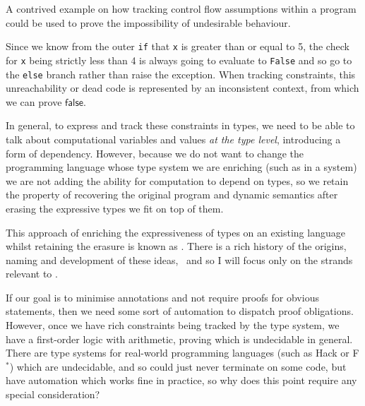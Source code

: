 \begin{marginfigure}
    \inputminted[breaklines,mathescape,fontsize=\small]{py}{code/dead_code.py}
    \caption{A contrived example on how tracking control flow assumptions
        within a program could be used to prove the impossibility of
        undesirable behaviour.}\label{fig:dead-code}
\end{marginfigure}

Since we know from the outer \texttt{if} that \texttt{x} is
greater than or equal to 5, the check for \texttt{x} being strictly
less than 4 is always going to evaluate to \texttt{False} and so go to
the \texttt{else} branch rather than raise the exception. When tracking
constraints, this unreachability or dead code is represented by an inconsistent
context, from which we can prove $\mathsf{false}$.

In general, to express and track these constraints in types, we need to be able
to talk about computational variables and values \emph{at the type level},
introducing a form of dependency. However, because we do not want to change the
programming language whose type system we are enriching (such as in a
 system) we are not adding the ability for computation to
depend on types, so we retain the property of recovering the original program
and dynamic semantics after erasing the expressive types we fit on top of them.

This approach of enriching the expressiveness of types on an existing language
whilst retaining the erasure is known as . There is a
rich history of the origins, naming and development of these
ideas,~ and so I will focus only on the strands
relevant to .

If our goal is to minimise annotations and not require proofs for obvious
statements, then we need some sort of automation to dispatch proof
obligations. However, once we have rich constraints being tracked by the type
system, we have a first-order logic with arithmetic, proving which is
undecidable in general. There are type systems for real-world
programming languages (such as Hack or F$^*$) which are undecidable, and so
could just never terminate on some code, but have automation which works fine
in practice, so why does this point require any special consideration?

